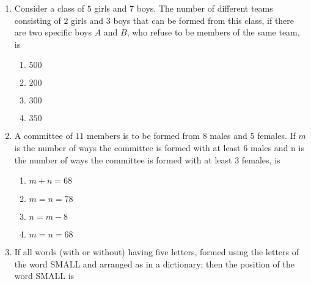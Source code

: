 \begin{enumerate}[label=\thesubsection.\arabic*,ref=\thesubsection.\theenumi]
 \begin{multicols}{4}
\begin{enumerate}    
     \item less than $500$ 
     \item at least $500$ but less than $750$
     \item at least $750$ but less than $1000$
     \item at least $1000$
     \end{enumerate}
\end{multicols}
%
	\item Consider a class of $5$ girls and $7$ boys. The number of different teams consisting of $2$ girls and $3$ boys that can be formed from this class, if there are two specific boys $A$ and $B$, who refuse to be members of the same team, is\hfill{}
\begin{multicols}{4}
\begin{enumerate}    
    \item $500$  
    \item $200$
    \item $300$
    \item $350$
    \end{enumerate}
\end{multicols}
%
	\item A committee of $11$ members is to be formed from $8$ males and $5$ females. If $m$ is the number of ways the committee is formed with at least $6$ males and n is the number of ways the committee is formed with at least $3$ females,  is
		\hfill{}
\begin{multicols}{4}
\begin{enumerate}    
      \item $m+n=68$ 
      \item $m=n=78$
      \item $n=m-8$
      \item $m=n=68$
  \end{enumerate}
\end{multicols}  
%    
	    \item If all words (with or without) having five letters, formed using the letters of the word SMALL and arranged as in a dictionary; then the position of the word SMALL is 


\end{enumerate}
